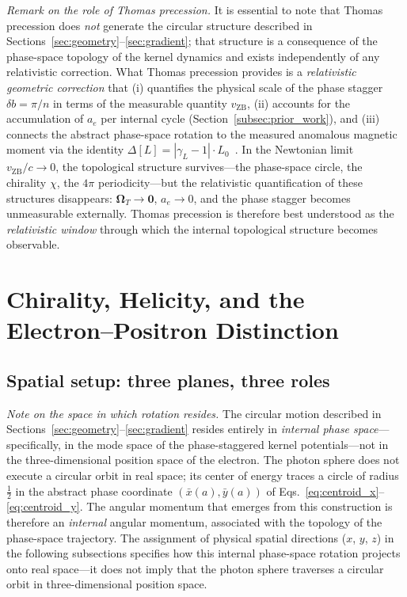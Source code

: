 \documentclass[%
 reprint, amsmath,amssymb, aps, prb, ]{revtex4-2}
\numberwithin{equation}{section}
\begin{document}
\noindent\textit{Remark on the role of Thomas precession.} It is essential to note that Thomas precession does \emph{not} generate the circular structure described in Sections~\ref{sec:geometry}--\ref{sec:gradient}; that structure is a consequence of the phase-space topology of the kernel dynamics and exists independently of any relativistic correction. What Thomas precession provides is a \emph{relativistic geometric correction} that (i) quantifies the physical scale of the phase stagger $\delta b = \pi/n$ in terms of the measurable quantity $v_\mathrm{ZB}$, (ii) accounts for the accumulation of $a_e$ per internal cycle (Section~\ref{subsec:prior_work}), and (iii) connects the abstract phase-space rotation to the measured anomalous magnetic moment via the identity $\Delta[L]=|\gamma_L-1|\cdot L_0$~\cite{hanamura47}. In the Newtonian limit $v_\mathrm{ZB}/c\to 0$, the topological structure survives---the phase-space circle, the chirality $\chi$, the $4\pi$ periodicity---but the relativistic quantification of these structures disappears: $\boldsymbol{\Omega}_T\to\mathbf{0}$, $a_e\to 0$, and the phase stagger becomes unmeasurable externally. Thomas precession is therefore best understood as the \emph{relativistic window} through which the internal topological structure becomes observable.

\section{Chirality, Helicity, and the Electron--Positron Distinction}
\label{sec:chirality}

\subsection{Spatial setup: three planes, three roles}

\noindent\textit{Note on the space in which rotation resides.} The circular motion described in Sections~\ref{sec:geometry}--\ref{sec:gradient} resides entirely in \emph{internal phase space}---specifically, in the mode space of the phase-staggered kernel potentials---not in the three-dimensional position space of the electron. The photon sphere does not execute a circular orbit in real space; its center of energy traces a circle of radius $\tfrac{1}{2}$ in the abstract phase coordinate $(\bar{x}(a), \bar{y}(a))$ of Eqs.~\eqref{eq:centroid_x}--\eqref{eq:centroid_y}. The angular momentum that emerges from this construction is therefore an \emph{internal} angular momentum, associated with the topology of the phase-space trajectory. The assignment of physical spatial directions ($x$, $y$, $z$) in the following subsections specifies how this internal phase-space rotation projects onto real space---it does not imply that the photon sphere traverses a circular orbit in three-dimensional position space.
\end{document}
